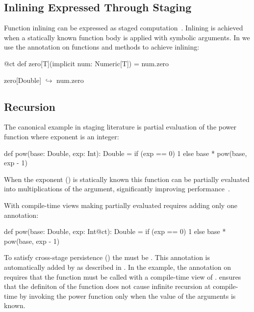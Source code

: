 \subsection{Inlining Expressed Through Staging}
\label{sct:inlining}

Function inlining can be expressed as staged computation~\cite{monnier2003inlining}.
 Inlining is achieved when a statically known function body is applied with symbolic
 arguments. In \ct we use the  annotation on functions and methods to achieve inlining:\begin{lstparagraph}
@ct def zero[T](implicit num: Numeric[T]) = num.zero

zero[Double]
  $\hookrightarrow$ num.zero
\end{lstparagraph}


\subsection{Recursion}
\label{sct:recursion}

The canonical example in staging literature is partial evaluation of the power function
 where exponent is an integer:
\begin{lstparagraph}
def pow(base: Double, exp: Int): Double =
  if (exp == 0) 1 else base * pow(base, exp - 1)
\end{lstparagraph} When the exponent () is statically known this function can be partially
evaluated into  multiplications of the  argument, significantly
improving performance~\cite{calcagno2003implementing}.

With compile-time views making  partially evaluated requires adding only one annotation:

\begin{lstparagraph}
def pow(base: Double, exp: Int@ct): Double =
  if (exp == 0) 1 else base * pow(base, exp - 1)
\end{lstparagraph}

To satisfy cross-stage persistence () the  must be .
This annotation is automatically added by \ct as described in . In the example,
 the  annotation on  requires that the function must be called with
 a compile-time view of . \ct ensures that the definiton of the  function
 does not cause infinite recursion at compile-time by invoking the power function
 only when the value of the  arguments is known.

